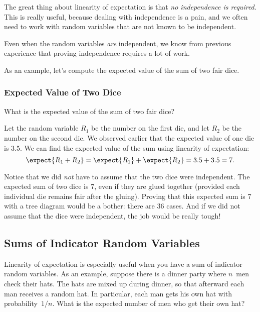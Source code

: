 The great thing about linearity of expectation is that \emph{no
independence is required}.  This is really useful, because dealing with
independence is a pain, and we often need to work with random variables
that are not known to be independent.

\begin{editingnotes}
Even when the random variables \emph{are} independent, we know
from previous experience that proving independence requires a lot of
work.
\end{editingnotes}

As an example, let's compute the expected value of the sum of two fair
dice.

\subsubsection{Expected Value of Two Dice}

What is the expected value of the sum of two fair dice?

Let the random variable $R_1$ be the number on the first die, and let
$R_2$ be the number on the second die.  We observed earlier that the
expected value of one die is 3.5.  We can find the expected value of the
sum using linearity of expectation:
\begin{equation*}
\expect{R_1 + R_2} 
 =   \expect{R_1} + \expect{R_2}
 =    3.5 + 3.5
 =    7.
\end{equation*}

Notice that we did \emph{not} have to assume that the two dice were
independent.  The expected sum of two dice is 7, even if they are
glued together (provided each individual die remains fair after the
gluing).  Proving that this expected sum is 7 with a tree diagram
would be a bother: there are 36 cases.  And if we did not assume that
the dice were independent, the job would be really tough!

\subsection{Sums of Indicator Random Variables}\label{sec:hat_check}

Linearity of expectation is especially useful when you have a sum of
indicator random variables.  As an example, suppose there is a dinner
party where $n$~men check their hats.  The hats are mixed up during
dinner, so that afterward each man receives a random hat.  In
particular, each man gets his own hat with probability~$1/n$.  What is
the expected number of men who get their own hat?

